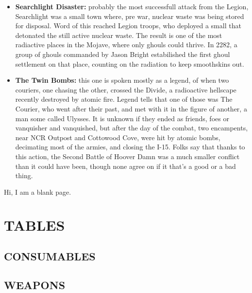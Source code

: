 \documentclass[11pt]{article} %
\begin{document}
\begin{itemize}
	\item \textbf{Searchlight Disaster:} probably the most successfull attack from the Legion, Searchlight was a small town where, pre war, nuclear waste was being stored for disposal. Word of this reached Legion troops, who deployed a small  that detonated the still active nuclear waste. The result is one of the most radiactive places in the Mojave, where only ghouls could thrive. In 2282, a group of ghouls commanded by Jason Bright estabilished the first ghoul settlement on that place, counting on the radiation to keep smoothskins out.
	
	\item \textbf{The Twin Bombs:} this one is spoken mostly as a legend, of when two couriers, one chasing the other, crossed the Divide, a radioactive hellscape recently destroyed by atomic fire. Legend tells that one of those was The Courier, who went after their past, and met with it in the figure of another, a man some called Ulysses. It is unknown if they ended as friends, foes or vanquisher and vanquished, but after the day of the combat, two encampents, near NCR Outpost and Cottowood Cove, were hit by atomic bombs, decimating most of the armies, and closing the I-15. Folks say that thanks to this action, the Second Battle of Hoover Damn was a much smaller conflict than it could have been, though none agree on if it that's a good or a bad thing.
\end{itemize}


\newpage
Hi, I am a blank page.
\newpage

\appendix
\addtolength{\oddsidemargin}{-0.9in}
\addtolength{\evensidemargin}{-0.9in}
\addtolength{\textwidth}{1.8in}
\section{TABLES}
	
	\label{app:traits}
	
	\label{app:perks}
\subsection{CONSUMABLES}
	
	
	
	\label{app:chems}
	
\newpage

\subsection{WEAPONS}
\label{app:weapons}
	
	
	
	
	
	
	
	
	
	
	
	
	
\newpage
\end{document}

